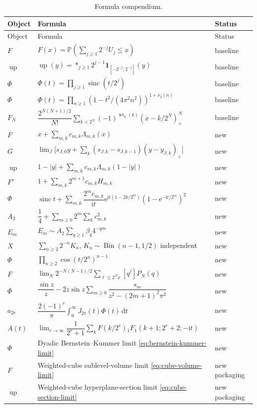 \documentclass[11pt,oneside]{article}
\theoremstyle{definition}
\theoremstyle{remark}
\newcommand{\Prob}{\mathbb P}
\newcommand{\Up}{\operatorname{up}}
\newcommand{\sinc}{\operatorname{sinc}}
\newcommand{\dd}{\,\mathrm d}
\newcommand{\ii}{\mathrm i}
\newcommand{\e}{\mathrm e}
\newcommand{\wt}{\operatorname{wt}_2}
\newcommand{\vtwo}{\nu_2}
\newcommand{\1}{\mathbf 1}
\begin{document}
\begin{longtable}{@{}p{}p{}p{}@{}}
\caption{Formula compendium.}\label{tab:compendium}\\
\toprule
Object & Formula & Status\\
\midrule
\endfirsthead
\toprule
Object & Formula & Status\\
\midrule
\endhead
$F$ & $F(x)=\Prob(\sum_{j\ge1}2^{-j}U_j\le x)$ & baseline\\
$\Up$ & $\Up(y)=\mathop{\ast}_{j\ge1}2^{j-1}\1_{[-2^{-j},2^{-j}]}(y)$ & baseline\\
$\Phi$ & $\Phi(t)=\prod_{j\ge1}\sinc(t/2^j)$ & baseline\\
$\Phi$ & $\Phi(t)=\prod_{n\ge1}(1-t^2/(4\pi^2n^2))^{1+\vtwo(n)}$ & baseline\\
$F_N$ & $\dfrac{2^{N(N+1)/2}}{N!}\sum_{k<2^N}(-1)^{\wt(k)}(x-k/2^N)_+^N$ & baseline\\
$F$ & $x+\sum_{m,k}c_{m,k}\Lambda_{m,k}(x)$ & new\\
$G$ & $\lim_J\bigl[s_{J,0}y+\sum_k(s_{J,k}-s_{J,k-1})(y-y_{J,k})_+\bigr]$ & new\\
$\Up$ & $1-|y|+\sum_{m,k}c_{m,k}\Lambda_{m,k}(1-|y|)$ & new\\
$F'$ & $1+\sum_{m,k}2^{m+1}c_{m,k}H_{m,k}$ & new\\
$\Phi$ & $\sinc t+\sum_{m,k}\dfrac{2^mc_{m,k}}{\ii t}\e^{\ii t(1-2k/2^m)}(1-\e^{-\ii t/2^m})^2$ & new\\
$A_2$ & $\dfrac14+\sum_{m\ge0}2^m\sum_kc_{m,k}^2$ & new\\
$E_m$ & $E_m\sim A_2\sum_{q\ge1}\beta_q4^{-qm}$ & new\\
$X$ & $\sum_{n\ge2}2^{-n}K_n$, $K_n\sim\operatorname{Bin}(n-1,1/2)$ independent & new\\
$\Phi$ & $\prod_{n\ge2}\cos(t/2^n)^{n-1}$ & new\\
$F$ & $\lim_N2^{-N(N-1)/2}\sum_{\ell\le2^Nx}[q^\ell]P_N(q)$ & new\\
$\Phi$ & $\dfrac{\sin z}{z}-2z\sin z\sum_{m\ge0}\dfrac{s_m}{z^2-(2m+1)^2\pi^2}$ & new\\
$a_{2r}$ & $\dfrac{2(-1)^r}{\pi}\int_0^\infty J_{2r}(t)\Phi(t)\dd t$ & new\\
$A(t)$ & $\lim_{r\to\infty}\dfrac1{2^r+1}\sum_kF(k/2^r){}_1F_1(k+1;2^r+2;-\ii t)$ & new\\
$\Phi$ & Dyadic Bernstein--Kummer limit \eqref{eq:bernstein-kummer-limit} & new\\
$F$ & Weighted-cube sublevel-volume limit \eqref{eq:cube-volume-limit} & new packaging\\
$\Up$ & Weighted-cube hyperplane-section limit \eqref{eq:cube-section-limit} & new packaging\\
\bottomrule
\end{longtable}
\end{document}

